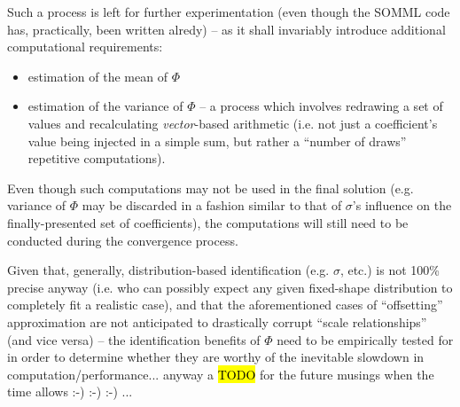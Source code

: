\documentclass[12pt,a4paper]{article}
\begin{document}
Such a process is left for further experimentation (even though the SOMML code has, practically, been written alredy) -- as it shall invariably introduce additional computational requirements:
\begin{itemize}
\item estimation of the mean of \(\Phi\)
\item estimation of the variance of \(\Phi\) -- a process which involves redrawing a set of values and recalculating \textit{vector}-based arithmetic (i.e. not just a coefficient's value being injected in a simple sum, but rather a ``number of draws'' repetitive computations).
\end{itemize}

Even though such computations may not be used in the final solution (e.g. variance of \(\Phi\) may be discarded in a fashion similar to that of \(\sigma\)'s influence on the finally-presented set of coefficients), the computations will still need to be conducted during the convergence process.

Given that, generally, distribution-based identification (e.g. \(\sigma\), etc.) is not 100\% precise anyway (i.e. who can possibly expect any given fixed-shape distribution to completely fit a realistic case), and that the aforementioned cases of ``offsetting'' approximation are not anticipated to drastically corrupt ``scale relationships'' (and vice versa) -- the identification benefits of \(\Phi\) need to be empirically tested for in order to determine whether they are worthy of the inevitable slowdown in computation/performance... anyway a \hl{TODO} for the future musings when the time allows :-) :-) :-) ... 
\end{document}
